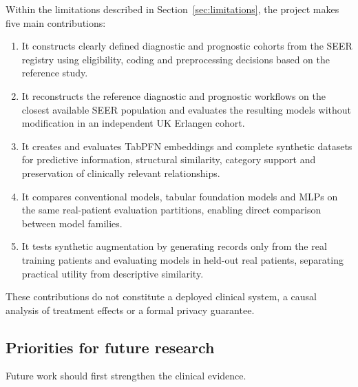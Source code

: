 Within the limitations described in Section~\ref{sec:limitations}, the project
makes five main contributions:

\begin{enumerate}[label=\textbf{C\arabic*.},ref=C\arabic*]
\item It constructs clearly defined diagnostic and prognostic cohorts from the
SEER registry using eligibility, coding and preprocessing decisions based on
the reference study.

\item It reconstructs the reference diagnostic and prognostic workflows on the
closest available SEER population and evaluates the resulting models without
modification in an independent UK Erlangen cohort.

\item It creates and evaluates TabPFN embeddings and complete synthetic
datasets for predictive information, structural similarity, category support
and preservation of clinically relevant relationships.

\item It compares conventional models, tabular foundation models and MLPs on
the same real-patient evaluation partitions, enabling direct comparison between
model families.

\item It tests synthetic augmentation by generating records only from the real
training patients and evaluating models in held-out real patients, separating
practical utility from descriptive similarity.
\end{enumerate}

These contributions do not constitute a deployed clinical system, a causal
analysis of treatment effects or a formal privacy guarantee.

\subsection{Priorities for future research}

Future work should first strengthen the clinical evidence.

